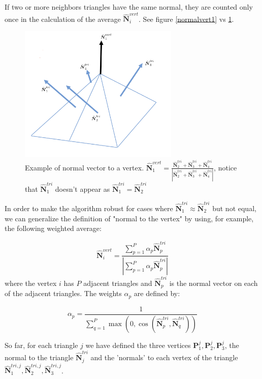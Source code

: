 \documentclass[11pt]{article}
\newcommand\bP{\boldsymbol P}
\newcommand\bN{\boldsymbol N}
\begin{document}
If two or more neighbors triangles have the same  normal, they are counted only once in the calculation of the average $\hat{\bN}_i^{vert}$. See figure \ref{normalvert1} vs \ref{normalvert2}.

\begin{figure}[H]
\begin{center}
\includegraphics[width=3in]{normal_vertex_2.png}%
\end{center}
\caption{Example of normal vector to a vertex. $\hat{\bN}_1^{vert}=\frac{\hat{\bN}_2^{tri}+\hat{\bN}_3^{tri}+\hat{\bN}_4^{tri}}{|\hat{\bN}_2^{tri}+\hat{\bN}_3^{tri}+\hat{\bN}_4^{tri}|}$, notice that $\hat{\bN}_1^{tri}$ doesn't appear as $\hat{\bN}_1^{tri}=\hat{\bN}_2^{tri}$}
\label{normalvert2}
\end{figure}

In order to make the algorithm robust for cases where $\hat{\bN}_1^{tri}\approx\hat{\bN}_2^{tri}$ but not equal, we can generalize the definition of "normal to the vertex" by using, for example, the following weighted average:

\begin{equation}
\hat{\bN}_i^{vert}=\frac{\sum_{p=1}^P\alpha_p \hat{\bN}_p^{tri}}{|\sum_{p=1}^P\alpha_p \hat{\bN}_p^{tri}|}
\end{equation}
where the vertex $i$ has $P$ adjacent triangles and $\hat{\bN}_p^{tri}$ is the normal vector on each of the adjacent triangles. The weights $\alpha_p$ are defined by:

\begin{equation}
\alpha_p=\frac{1}{\sum_{q=1}^P\max(0,\cos(\hat{\bN}_p^{tri},\hat{\bN}_q^{tri}))}
\end{equation}

So far, for each triangle $j$ we have defined the three vertices $\bP_1^j,\bP_2^j,\bP_3^j$, the normal to the triangle $\hat{\bN}^{tri}_j$ and the 'normals' to each vertex of the triangle $\hat{\bN}_1^{tri,j},\hat{\bN}_2^{tri,j},\hat{\bN}_3^{tri,j}$.
\end{document}
